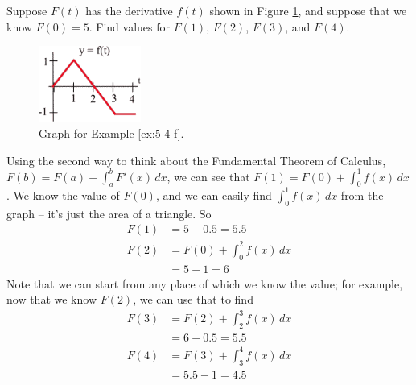 \begin{example}
  \label{ex:5-4-f}
Suppose $F(t)$ has the derivative $f(t)$ shown in Figure \ref{fig:5-4-f}, and suppose that we know $F(0)=5$. Find values for $F(1)$, $F(2)$, $F(3)$, and $F(4)$.
\begin{figure}[!ht]
  \centering
    \includegraphics[width=0.3\textwidth]{img/chap5/image036.png}
    \caption{Graph for Example \ref{ex:5-4-f}.}
    \label{fig:5-4-f}
\end{figure}

\begin{solution}
Using the second way to think about the Fundamental Theorem of Calculus, $F(b)=F(a)+\displaystyle\int_a^b F'(x)\,dx$, we can see that $F(1)=F(0)+\int_0^1 f(x)\,dx$. We know the value of $F(0)$, and we can easily find $\displaystyle\int_0^1 f(x)\,dx$ from the graph – it's just the area of a triangle. So
\begin{align*}
F(1) &= 5+0.5=5.5 \\
F(2) &= F(0)+\int_0^2 f(x)\,dx \\
    &= 5+1=6
\end{align*}
Note that we can start from any place of which we know the value; for example, now that we know $F(2)$, we can use that to find
\begin{align*}
F(3) &= F(2)+\int_2^3 f(x)\,dx \\
  &= 6-0.5 = 5.5 \\
F(4) &= F(3)+\int_3^4 f(x)\,dx  \\
  &= 5.5-1=4.5
\end{align*}
\end{solution}\end{example}


